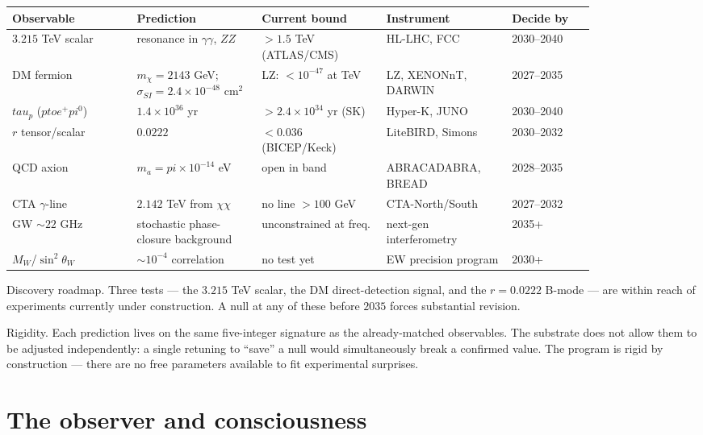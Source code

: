 \documentclass[11pt]{article}
\def\textbf#1{#1}%
\def\text#1{#1}%
\def\pi{pi}%
\def\tau{tau}%
\def\to{ to }%
\begin{document}
\begin{center}
\renewcommand{\arraystretch}{1.25}
\footnotesize
\begin{tabular}{p{0.18\linewidth} p{0.18\linewidth} p{0.18\linewidth} p{0.18\linewidth} p{0.12\linewidth}}
\toprule
\textbf{Observable} & \textbf{Prediction} & \textbf{Current bound} & \textbf{Instrument} & \textbf{Decide by} \\
\midrule
$3.215$ TeV scalar & resonance in $\gamma\gamma$, $ZZ$ & $> 1.5$ TeV (ATLAS/CMS) & HL-LHC, FCC & 2030--2040 \\
DM fermion & $m_\chi = 2143$ GeV; $\sigma_{\text{SI}} = 2.4\times 10^{-48}$ cm$^2$ & LZ: $< 10^{-47}$ at TeV & LZ, XENONnT, DARWIN & 2027--2035 \\
$\tau_p$ ($p\to e^+\pi^0$) & $1.4\times 10^{36}$ yr & $> 2.4\times 10^{34}$ yr (SK) & Hyper-K, JUNO & 2030--2040 \\
$r$ tensor/scalar & $0.0222$ & $< 0.036$ (BICEP/Keck) & LiteBIRD, Simons & 2030--2032 \\
QCD axion & $m_a = \pi \times 10^{-14}$ eV & open in band & ABRACADABRA, BREAD & 2028--2035 \\
CTA $\gamma$-line & $2.142$ TeV from $\chi\chi$ & no line $>100$ GeV & CTA-North/South & 2027--2032 \\
GW $\sim 22$ GHz & stochastic phase-closure background & unconstrained at freq. & next-gen interferometry & 2035+ \\
$M_W$/$\sin^2\theta_W$ & $\sim 10^{-4}$ correlation & no test yet & EW precision program & 2030+ \\
\bottomrule
\end{tabular}
\end{center}

\textbf{Discovery roadmap.} Three tests --- the $3.215$ TeV scalar, the DM direct-detection signal, and the $r = 0.0222$ B-mode --- are within reach of experiments currently under construction. A null at any of these before $2035$ forces substantial revision.

\textbf{Rigidity.} Each prediction lives on the same five-integer signature as the already-matched observables. The substrate does not allow them to be adjusted independently: a single retuning to ``save'' a null would simultaneously break a confirmed value. The program is rigid by construction --- there are no free parameters available to fit experimental surprises.

\section{The observer and consciousness}
\end{document}
